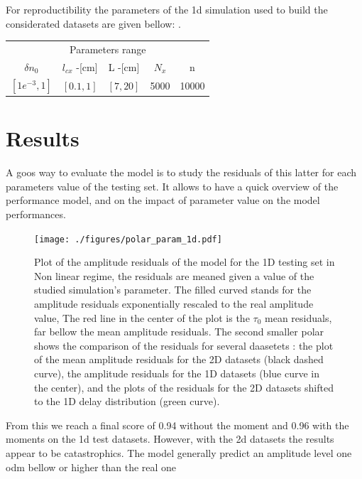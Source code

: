 \documentclass[11pt,a4paper,openany]{report}
\begin{document}
\begin{multicols}{2}
    For reproductibility the  parameters of the 1d simulation used to build the considerated datasets are given bellow: .
    \setlength{\tabcolsep}{.038\linewidth}
    \renewcommand{\arraystretch}{1.5}
    \begin{center}
        \begin{tabular}{ccccc}
            \toprule
            \multicolumn{5}{c}{Parameters range}                       \\
            \cmidrule{1 -5}
            $\delta n_0$   & $l_{cx}$ -[cm] & L -[cm]  & $N_x$ & n     \\
            \midrule
            $[1e^{-3}, 1]$ & $[0.1,1]$      & $[7,20]$ & 5000  & 10000 \\
            \bottomrule
        \end{tabular}
    \end{center}
    \section{Results}
    A goos way to evaluate the model is to study the residuals of this latter for each parameters value of the testing set. It allows to have a quick overview of the performance model, and on the impact of parameter value on the model performances.

    \begin{figure}[H]
        \texttt{[image: ./figures/polar\_param\_1d.pdf]}
        \caption{Plot of the amplitude residuals of the model for the 1D testing set in Non linear regime, the residuals are meaned given a value of the studied simulation's parameter. The filled curved stands for the amplitude residuals exponentially rescaled to the real amplitude value, The red line in the center of the plot is the $\tau_0$ mean residuals, far bellow the mean amplitude residuals. The second smaller polar shows the comparison of the residuals for several daasetets : the plot of the mean amplitude residuals for the 2D datasets (black dashed curve), the amplitude residuals for the 1D datasets (blue curve in the center), and the plots of the residuals for the 2D datasets shifted to the 1D delay distribution (green curve).}
        \label{fig:polar_1d}
    \end{figure}
    From this we reach a final score of 0.94 without the moment and 0.96 with the moments on the 1d test datasets. However, with  the 2d datasets the results appear to be catastrophics. The model generally predict an amplitude level one odm bellow or higher than the real one


\end{multicols}
\end{document}
